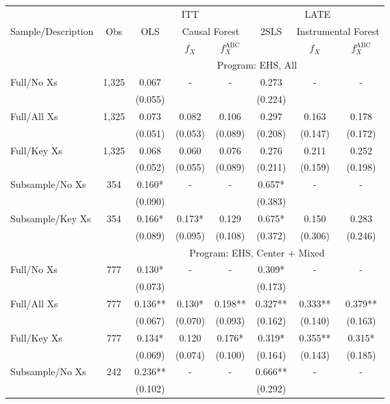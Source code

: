 \begin{tabular}{lccccccc}
\toprule 
\midrule 
\multicolumn{2}{c}{} & \multicolumn{3}{c}{ITT} & \multicolumn{3}{c}{LATE} \\
 \cmidrule(lr){3-5} \cmidrule(lr){6-8} 
Sample/Description & Obs & OLS & \multicolumn{2}{c}{Causal Forest} & 2SLS & \multicolumn{2}{c}{Instrumental Forest} \\
\multicolumn{3}{c}{} & $f_X$ & $f_X^{\text{ABC}}$ &  & $f_X$ & $f_X^{\text{ABC}}$ \\
\midrule 
 &  & \multicolumn{6}{c}{Program: EHS, All} \\
 \cmidrule(lr){3-8} 
Full/No Xs & 1,325 & 0.067 & - & - & 0.273 & - & - \\
 &  & (0.055) &  &  & (0.224) &  &  \\
Full/All Xs & 1,325 & 0.073 & 0.082 & 0.106 & 0.297 & 0.163 & 0.178 \\
 &  & (0.051) & (0.053) & (0.089) & (0.208) & (0.147) & (0.172) \\
Full/Key Xs & 1,325 & 0.068 & 0.060 & 0.076 & 0.276 & 0.211 & 0.252 \\
 &  & (0.052) & (0.055) & (0.089) & (0.211) & (0.159) & (0.198) \\
Subsample/No Xs & 354 & 0.160* & - & - & 0.657* & - & - \\
 &  & (0.090) &  &  & (0.383) &  &  \\
Subsample/Key Xs & 354 & 0.166* & 0.173* & 0.129 & 0.675* & 0.150 & 0.283 \\
 &  & (0.089) & (0.095) & (0.108) & (0.372) & (0.306) & (0.246) \\
\midrule 
 &  & \multicolumn{6}{c}{Program: EHS, Center $+$ Mixed} \\
 \cmidrule(lr){3-8} 
Full/No Xs & 777 & 0.130* & - & - & 0.309* & - & - \\
 &  & (0.073) &  &  & (0.173) &  &  \\
Full/All Xs & 777 & 0.136** & 0.130* & 0.198** & 0.327** & 0.333** & 0.379** \\
 &  & (0.067) & (0.070) & (0.093) & (0.162) & (0.140) & (0.163) \\
Full/Key Xs & 777 & 0.134* & 0.120 & 0.176* & 0.319* & 0.355** & 0.315* \\
 &  & (0.069) & (0.074) & (0.100) & (0.164) & (0.143) & (0.185) \\
Subsample/No Xs & 242 & 0.236** & - & - & 0.666** & - & - \\
 &  & (0.102) &  &  & (0.292) &  &  \\

\end{tabular}
